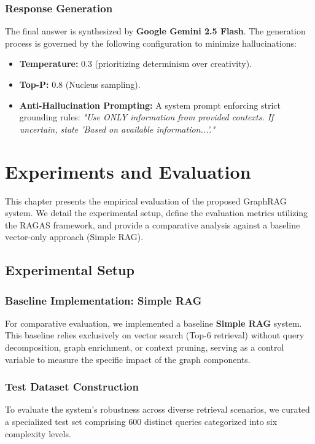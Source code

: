 \documentclass[a4paper, 12pt]{extreport}
\begin{document}
\subsection{Response Generation}
The final answer is synthesized by \textbf{Google Gemini 2.5 Flash}. The generation process is governed by the following configuration to minimize hallucinations:
\begin{itemize}
    \item \textbf{Temperature:} $0.3$ (prioritizing determinism over creativity).
    \item \textbf{Top-P:} $0.8$ (Nucleus sampling).
    \item \textbf{Anti-Hallucination Prompting:} A system prompt enforcing strict grounding rules: \textit{"Use ONLY information from provided contexts. If uncertain, state 'Based on available information...'."}
\end{itemize}


\chapter{Experiments and Evaluation}
\label{ch:experiments}

This chapter presents the empirical evaluation of the proposed GraphRAG system. We detail the experimental setup, define the evaluation metrics utilizing the RAGAS framework, and provide a comparative analysis against a baseline vector-only approach (Simple RAG).

\section{Experimental Setup}
\label{sec:exp_setup}
\subsection{Baseline Implementation: Simple RAG}
For comparative evaluation, we implemented a baseline \textbf{Simple RAG}\cite{lewis2020rag} system. This baseline relies exclusively on vector search (Top-6 retrieval) without query decomposition, graph enrichment, or context pruning, serving as a control variable to measure the specific impact of the graph components.
\subsection{Test Dataset Construction}
To evaluate the system's robustness across diverse retrieval scenarios, we curated a specialized test set comprising 600 distinct queries categorized into six complexity levels.
\end{document}
